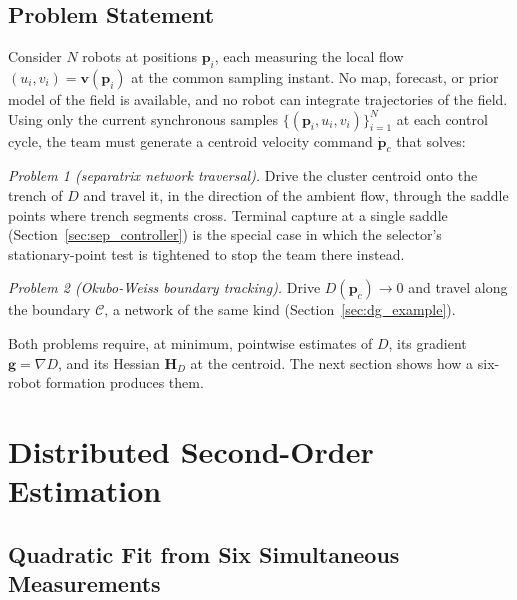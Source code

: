 \documentclass[12pt, letterpaper, oneside]{report}
\begin{document}
\subsection{Problem Statement}
\label{sec:problem_statement}

Consider $N$ robots at positions $\mathbf{p}_i$, each measuring the local
flow $(u_i,v_i)=\mathbf{v}(\mathbf{p}_i)$ at the common sampling instant.
No map, forecast, or prior model of the field is available, and no robot
can integrate trajectories of the field. Using only the current
synchronous samples $\{(\mathbf{p}_i,u_i,v_i)\}_{i=1}^N$ at each control
cycle, the team must generate a centroid velocity command
$\dot{\mathbf{p}}_c$ that solves:

\emph{Problem 1 (separatrix network traversal).} Drive the cluster
centroid onto the trench of $D$ and travel it, in the direction of the
ambient flow, through the saddle points where trench segments cross.
Terminal capture at a single saddle (Section~\ref{sec:sep_controller}) is
the special case in which the selector's stationary-point test is
tightened to stop the team there instead.

\emph{Problem 2 (Okubo-Weiss boundary tracking).} Drive
$D(\mathbf{p}_c)\to0$ and travel along the boundary $\mathcal{C}$, a
network of the same kind (Section~\ref{sec:dg_example}).

Both problems require, at minimum, pointwise estimates of $D$, its
gradient $\mathbf{g}=\nabla D$, and its Hessian $\mathbf{H}_D$ at the
centroid. The next section shows how a six-robot formation produces them.

\section{Distributed Second-Order Estimation}
\label{sec:estimation}

\subsection{Quadratic Fit from Six Simultaneous Measurements}
\end{document}
